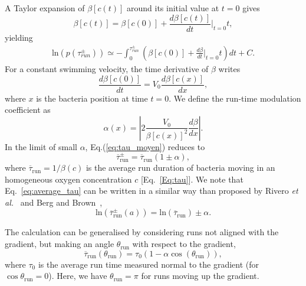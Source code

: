 \documentclass[aps,a4paper,twocolumn,10pt,pre,showpacs]{revtex4-2}
\begin{document}
A Taylor expansion of $\beta[c(t)]$ around its initial value at $t=0$ gives
\begin{equation}
    \beta[c(t)]=\beta[c(0)] + \frac{d\beta[c(t)]}{dt}\bigg|_{t=0} t,
    \end{equation}
yielding
\begin{equation}
\begin{split}
\text{ln}(p(\tau^{\pm}_{run}))\simeq
-\int_0^{\tau^{\pm}_{run}} \left( \beta[c(0)]+\frac{d\beta}{dt}\bigg|_{t=0} t \right) dt + C.%
\end{split}
\end{equation}
For a constant swimming velocity, the time derivative of $\beta$ writes
$$\frac{d\beta[c(0)]}{dt}=V_0 \frac{d\beta[c(x)]}{dx},$$
where $x$ is the bacteria position at time $t=0$. We define the run-time modulation coefficient as
$$
\alpha(x) = \left| {2}\frac{V_0}{\beta[c(x)]^2}\frac{d\beta}{dx} \right|.
$$
In the limit of small $\alpha$, Eq.(\ref{eq:tau_moyen}) reduces to
\begin{equation}
    \overline{\tau}^{\pm}_{\mathrm{run}}=\overline{\tau}_{\mathrm{run}}
    \left(1\pm \alpha \right),
    \label{eq:average_tau}
\end{equation}
where $\overline{\tau}_{\mathrm{run}} =1/\beta(c)$ is the average run duration of bacteria moving in an homogeneous oxygen concentration $c$ [Eq.~\eqref{Eq:tau}]. We note that Eq.~\eqref{eq:average_tau} can be written in a similar way than proposed by Rivero \emph{et al.}~\cite{rivero1989transport} and Berg and Brown~\cite{berg1972chemotaxis},
\begin{equation}
    \text{ln}(\overline{\tau}^\pm_{\mathrm{run}}(a))=\text{ln}(\overline{\tau}_{\mathrm{run}})\pm \alpha.
    \label{eq:lntau}
\end{equation}

The calculation can be generalised by considering runs not aligned with the gradient, but making an angle $\theta_{\mathrm{run}}$ with respect to the gradient,
\begin{equation}
    \overline{\tau}_{\mathrm{run}}(\theta_{\mathrm{run}})=\tau_{0} (1- \alpha \cos(\theta_{\mathrm{run}})),
    \label{eq:cos}
\end{equation}
where $\tau_{0}$ is the average run time measured normal to the gradient (for $\cos \theta_{\mathrm{run}}=0$). Here, we have $\theta_{\mathrm{run}}=\pi$ for runs moving up the gradient. 
\end{document}

